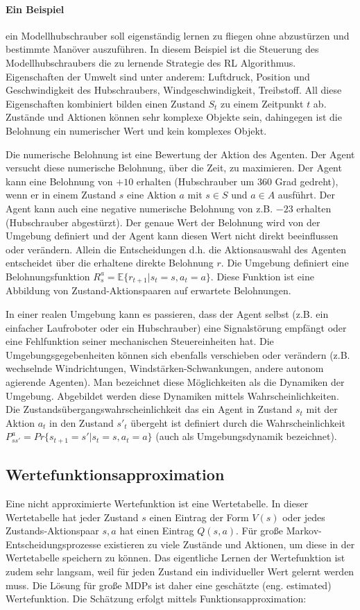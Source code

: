 \documentclass[conference]{IEEEtran}
\begin{document}
\paragraph*{Ein Beispiel} ein Modellhubschrauber soll eigenständig lernen zu fliegen ohne abzustürzen und bestimmte Manöver auszuführen. In diesem Beispiel ist die Steuerung des Modellhubschraubers die zu lernende Strategie des RL Algorithmus. Eigenschaften der Umwelt sind unter anderem: Luftdruck, Position und Geschwindigkeit des Hubschraubers, Windgeschwindigkeit, Treibstoff. All diese Eigenschaften kombiniert bilden einen Zustand $S_t$ zu einem Zeitpunkt $t$ ab. Zustände und Aktionen können sehr komplexe Objekte sein, dahingegen ist die Belohnung ein numerischer Wert und kein komplexes Objekt.

Die numerische Belohnung ist eine Bewertung der Aktion des Agenten. Der Agent versucht diese numerische Belohnung, über die Zeit, zu maximieren. Der Agent kann eine Belohnung von $+10$ erhalten (Hubschrauber um 360 Grad gedreht), wenn er in einem Zustand $s$ eine Aktion $a$ mit $s\in S$ und $a\in A$ ausführt. Der Agent kann auch eine negative numerische Belohnung von z.B. $-23$ erhalten (Hubschrauber abgestürzt). Der genaue Wert der Belohnung wird von der Umgebung definiert und der Agent kann diesen Wert nicht direkt beeinflussen oder verändern. Allein die Entscheidungen d.h. die Aktionsauswahl des Agenten entscheidet über die erhaltene direkte Belohnung $r$. Die Umgebung definiert eine Belohnungsfunktion $R_s^a = \mathbb{E}\{ r_{t+1} | s_t = s, a_t = a \}$. Diese Funktion ist eine Abbildung von Zustand-Aktionspaaren auf erwartete Belohnungen.

In einer realen Umgebung kann es passieren, dass der Agent selbst (z.B. ein einfacher Laufroboter oder ein Hubschrauber) eine Signalstörung empfängt oder eine Fehlfunktion seiner mechanischen Steuereinheiten hat. Die Umgebungsgegebenheiten können sich ebenfalls verschieben oder verändern (z.B. wechselnde Windrichtungen, Windstärken-Schwankungen, andere autonom agierende Agenten). Man bezeichnet diese Möglichkeiten als die Dynamiken der Umgebung. Abgebildet werden diese Dynamiken mittels Wahrscheinlichkeiten. Die Zustandsübergangswahrscheinlichkeit das ein Agent in Zustand $s_t$ mit der Aktion $a_t$ in den Zustand $s'_t$ übergeht ist definiert durch die Wahrscheinlichkeit $P^a_{ss'} = Pr \{ s_{t+1} = s' | s_t = s, a_t = a \}$ (auch als Umgebungsdynamik bezeichnet).

\subsection{Wertefunktionsapproximation}
Eine nicht approximierte Wertefunktion ist eine Wertetabelle. In dieser Wertetabelle hat jeder Zustand $s$ einen Eintrag der Form $V(s)$ oder jedes Zustands-Aktionspaar $s, a$ hat einen Eintrag $Q(s,a)$. Für große Markov-Entscheidungsprozesse existieren zu viele Zustände und Aktionen, um diese in der Wertetabelle speichern zu können. Das eigentliche Lernen der Wertefunktion ist zudem sehr langsam, weil für jeden Zustand ein individueller Wert gelernt werden muss. Die Lösung für große MDPs ist daher eine geschätzte (eng. estimated) Wertefunktion. Die Schätzung erfolgt mittels Funktionsapproximation:
\end{document}
